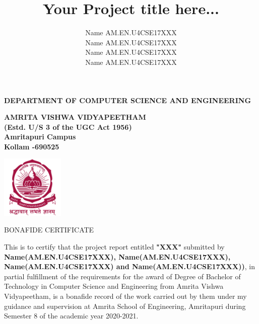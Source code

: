 \documentclass[oneside,12pt]{Classes/CUEDthesisPSnPDF}
\title{Your Project title here...}
\author{Name AM.EN.U4CSE17XXX\\ Name AM.EN.U4CSE17XXX\\ Name AM.EN.U4CSE17XXX\\ Name AM.EN.U4CSE17XXX}
\begin{document}
\maketitle


\begin{center}


{\normalsize {\bfseries{DEPARTMENT OF COMPUTER SCIENCE AND ENGINEERING\\[1ex]}}}


{\normalsize {\bfseries{AMRITA VISHWA VIDYAPEETHAM \\ (Estd. U/S 3 of the UGC Act 1956) \\[1ex]Amritapuri  Campus \\[1ex] Kollam -690525\\[1ex]}}}

	\includegraphics[width=30mm]{UNIVEMBLEM.jpg}


				\rmfamily\bfseries\upshape\Large

				BONAFIDE CERTIFICATE \\[2ex] %

\end{center}


\rmfamily\mdseries\upshape\normalsize					

This is to certify that the project report entitled \textbf{"XXX"} submitted by \textbf{Name(AM.EN.U4CSE17XXX), Name(AM.EN.U4CSE17XXX), Name(AM.EN.U4CSE17XXX) and Name(AM.EN.U4CSE17XXX))}, in partial fulfillment of the requirements for the award of Degree of Bachelor of Technology in Computer Science and Engineering from Amrita Vishwa Vidyapeetham, is a bonafide record of the work carried out by them under my guidance and supervision at Amrita School of Engineering, Amritapuri during Semester 8 of the academic year 2020-2021. 
\end{document}
